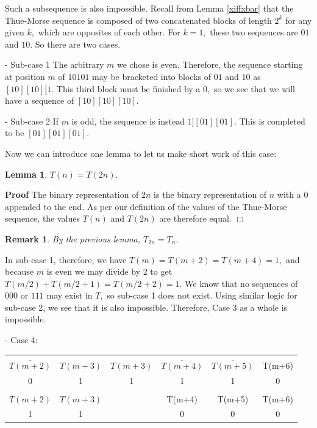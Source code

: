 \documentclass{article}
\newtheorem{lemma}{Lemma}[section]
\newtheorem{remark}{Remark}[section]
\begin{document}
Such a subsequence is also impossible. Recall from Lemma \ref{xiffxbar} that the Thue-Morse sequence is composed of two concatenated blocks of length $2^k$ for any given $k,$ which are opposites of each other. For $k = 1,$ these two sequences are $01$ and $10.$ So there are two cases.

- Sub-case 1
The arbitrary $m$ we chose is even. Therefore, the sequence starting at position $m$ of $10101$ may be bracketed into blocks of $01$ and $10$ as $[10][10][1.$ This third block must be finished by a $0,$ so we see that we will have a sequence of $[10][10][10].$

- Sub-case 2
If $m$ is odd, the sequence is instead $1][01][01].$ This is completed to be $[01][01][01].$

Now we can introduce one lemma to let us make short work of this case:

\begin{lemma}
$T(n) = T(2n).$
\end{lemma}
\textbf{Proof} The binary representation of $2n$ is the binary representation of $n$ with a $0$ appended to the end. As per our definition of the values of the Thue-Morse sequence, the values $T(n)$ and $T(2n)$ are therefore equal. $\Box$

\begin{remark}
By the previous lemma, $T_{2n} = T_n.$
\end{remark}

In sub-case 1, therefore, we have $T(m) = T(m+2) = T(m+4) = 1,$ and because $m$ is even we may divide by 2 to get $T(m/2) + T(m/2 + 1) = T(m/2 + 2) = 1.$ We know that no sequences of $000$ or $111$ may exist in $T,$ so sub-case 1 does not exist. Using similar logic for sub-case 2, we see that it is also impossible. Therefore, Case 3 as a whole is impossible.

- Case 4:

\begin{center}
\begin{tabular}{ |c|c|c|c|c|c| } 
 \hline
 &&&&&\\
$\overline{T(m+2)}$ & $T(m+3)$ & $T(m+3)$ & $\overline{T(m+4)}$ & $\overline{T(m+5)}$ & T(m+6) \\ 
0 & 1 & 1 & 1 & 1 & 0 \\
\hline
&&&&&\\
$T(m+2)$ & $T(m+3)$ & & T(m+4) & T(m+5) & T(m+6) \\
1 & 1 & & 0 & 0 & 0 \\
 \hline
\end{tabular}
\end{center}
\end{document}
